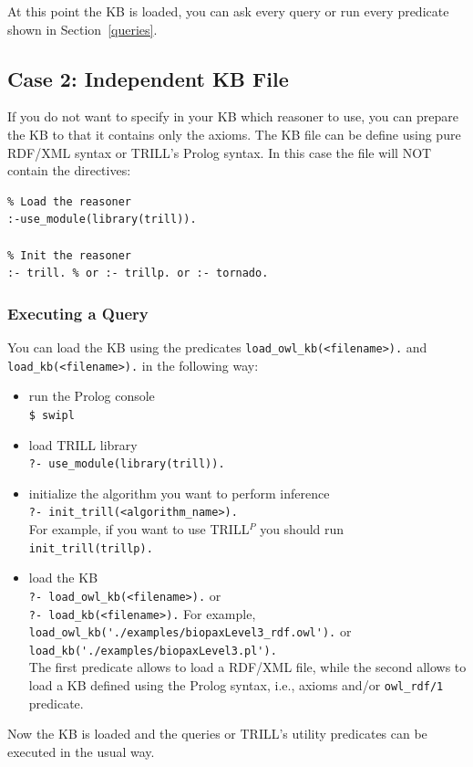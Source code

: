 \documentclass[a4paper,10pt]{scrartcl}
\begin{document}
At this point the KB is loaded, you can ask every query or run every predicate shown in Section~\ref{queries}.

\subsection{Case 2: Independent KB File}
If you do not want to specify in your KB which reasoner to use, you can prepare the KB to that it contains only the axioms. The KB file can be define using pure RDF/XML syntax or TRILL's Prolog syntax. In this case the file will NOT contain the directives:
\begin{verbatim}
% Load the reasoner
:-use_module(library(trill)).

% Init the reasoner
:- trill. % or :- trillp. or :- tornado.
\end{verbatim}

\subsubsection{Executing a Query}
\label{sec:trillq2}
You can load the KB using the predicates \verb|load_owl_kb(<filename>).| and \verb|load_kb(<filename>).| in the following way:
\begin{itemize}
	\item run the Prolog console\\
	\verb|$ swipl|
	\item load TRILL library\\
	\verb|?- use_module(library(trill)).|
	\item initialize the algorithm you want to perform inference\\
	\verb|?- init_trill(<algorithm_name>).|\\
	For example, if you want to use TRILL$^P$ you should run \verb|init_trill(trillp).|
	\item load the KB\\
	\verb|?- load_owl_kb(<filename>).| or\\
	\verb|?- load_kb(<filename>).|
	For example, \verb|load_owl_kb('./examples/biopaxLevel3_rdf.owl').| or \verb|load_kb('./examples/biopaxLevel3.pl').|\\
	The first predicate allows to load a RDF/XML file, while the second allows to load a KB defined using the Prolog syntax, i.e., axioms and/or \verb|owl_rdf/1| predicate.
\end{itemize}
\noindent
Now the KB is loaded and the queries or TRILL's utility predicates can be executed in the usual way.
\end{document}
